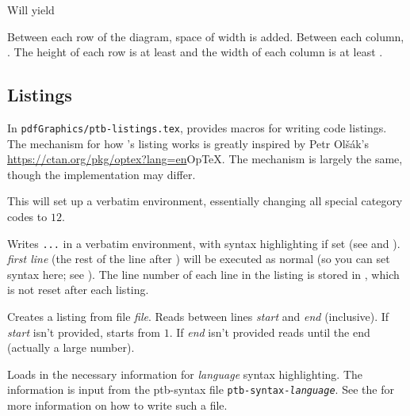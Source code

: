 Will yield

\centerline{}

Between each row of the diagram, space of width \macro\diagrowbuf{} is added.
Between each column, \macro\diagcolbuf.
The height of each row is at least \macro\diagrowheight{} and the width of each column is at least \macro\diagcolwidth.

\subsection{Listings}

In {\tt pdfGraphics/ptb-listings.tex}, \pdftoolbox{} provides macros for writing code listings.
The mechanism for how \pdftoolbox's listing works is greatly inspired by Petr Ol\v s\'ak's \url{https://ctan.org/pkg/optex?lang=en}{Op\TeX}.
The mechanism is largely the same, though the implementation may differ.

\macroexp{\setupverb}
This will set up a verbatim environment, essentially changing all special category codes to $12$.
\emacroexp

Writes {\tt...} in a verbatim environment, with syntax highlighting if set (see \gotomacro\loadsyntax{} and \gotomacro\setsyntax).
{\it first line} (the rest of the line after \macro\blisting) will be executed as normal (so you can set syntax here; see \gotomacro\setsyntax).
The line number of each line in the listing is stored in \macro\lstlinenum\anchormacro\lstlinennum, which is not reset after each listing.
\emacroexp

Creates a listing from file {\it file}.
Reads between lines {\it start} and {\it end} (inclusive).
If {\it start} isn't provided, starts from $1$.
If {\it end} isn't provided reads until the end (actually a large number).
\emacroexp

Loads in the necessary information for {\it language} syntax highlighting.
The information is input from the ptb-syntax file {\tt ptb-syntax-{\it language}}.
See the  for more information on how to write such a file.

